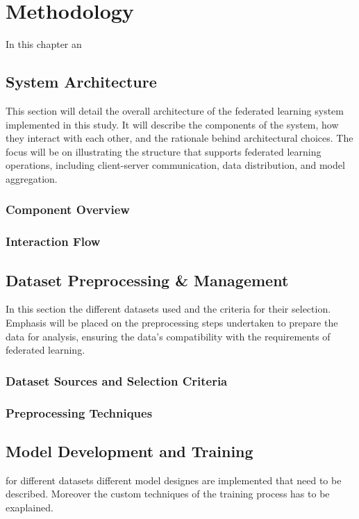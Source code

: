 \chapter{Methodology}
In this chapter an 


\section{System Architecture}
This section will detail the overall architecture of the federated learning system implemented in this study.
It will describe the components of the system, how they interact with each other, and the rationale behind architectural choices.
The focus will be on illustrating the structure that supports federated learning operations, including client-server communication,
data distribution, and model aggregation.

\subsection{Component Overview}
\subsection{Interaction Flow}

\section{Dataset Preprocessing \& Management}
In this section the different datasets used and the criteria for their selection.
Emphasis will be placed on the preprocessing steps undertaken to prepare the data
for analysis, ensuring the data's compatibility with the requirements of federated
learning.

\subsection{Dataset Sources and Selection Criteria}
\subsection{Preprocessing Techniques}

\section{Model Development and Training}
for different datasets different model designes are implemented that need to be described.
Moreover the custom techniques of the training process has to be exaplained.

